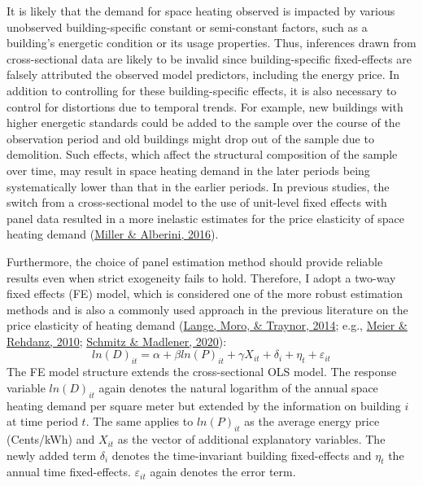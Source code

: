 \documentclass[12pt,twoside]{reedthesis}
\begin{document}
It is likely that the demand for space heating observed is impacted by various unobserved building-specific constant or semi-constant factors, such as a building's energetic condition or its usage properties. Thus, inferences drawn from cross-sectional data are likely to be invalid since building-specific fixed-effects are falsely attributed the observed model predictors, including the energy price. In addition to controlling for these building-specific effects, it is also necessary to control for distortions due to temporal trends. For example, new buildings with higher energetic standards could be added to the sample over the course of the observation period and old buildings might drop out of the sample due to demolition. Such effects, which affect the structural composition of the sample over time, may result in space heating demand in the later periods being systematically lower than that in the earlier periods. In previous studies, the switch from a cross-sectional model to the use of unit-level fixed effects with panel data resulted in a more inelastic estimates for the price elasticity of space heating demand (\protect\hyperlink{ref-miller_alberini16}{Miller \& Alberini, 2016}).

Furthermore, the choice of panel estimation method should provide reliable results even when strict exogeneity fails to hold. Therefore, I adopt a two-way fixed effects (FE) model, which is considered one of the more robust estimation methods and is also a commonly used approach in the previous literature on the price elasticity of heating demand (\protect\hyperlink{ref-lange_etal14}{Lange, Moro, \& Traynor, 2014}; e.g., \protect\hyperlink{ref-meier_rehdanz10}{Meier \& Rehdanz, 2010}; \protect\hyperlink{ref-schmitz_madlener20}{Schmitz \& Madlener, 2020}):
\begin{equation}
ln(D)_{it} = \alpha + \beta ln(P)_{it} + \gamma X_{it} + \delta_i + \eta_t + \varepsilon_{it}
\label{eq:fe-eq}
\end{equation}
The FE model structure extends the cross-sectional OLS model. The response variable \(ln(D)_{it}\) again denotes the natural logarithm of the annual space heating demand per square meter but extended by the information on building \(i\) at time period \(t\). The same applies to \(ln(P)_{it}\) as the average energy price (Cents/kWh) and \(X_{it}\) as the vector of additional explanatory variables. The newly added term \(\delta_i\) denotes the time-invariant building fixed-effects and \(\eta_t\) the annual time fixed-effects. \(\varepsilon_{it}\) again denotes the error term.
\end{document}
